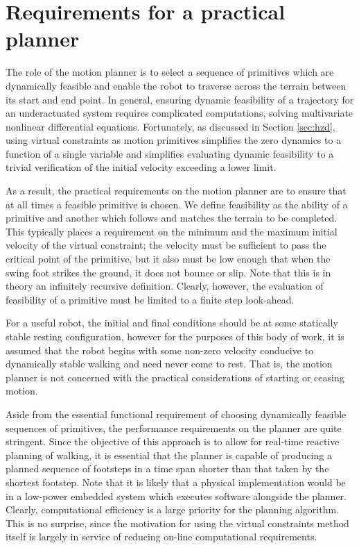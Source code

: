 \section{Requirements for a practical planner}
The role of the motion planner is to select a sequence of primitives which are dynamically feasible and enable the robot to traverse across the terrain between its start and end point. In general, ensuring dynamic feasibility of a trajectory for an underactuated system requires complicated computations, solving multivariate nonlinear differential equations. Fortunately, as discussed in Section \ref{sec:hzd}, using virtual constraints as motion primitives simplifies the zero dynamics to a function of a single variable and simplifies evaluating dynamic feasibility to a trivial verification of the initial velocity exceeding a lower limit.

As a result, the practical requirements on the motion planner are to ensure that at all times a feasible primitive is chosen. We define feasibility as the ability of a primitive and another which follows and matches the terrain to be completed. This typically places a requirement on the minimum and the maximum initial velocity of the virtual constraint; the velocity must be sufficient to pass the critical point of the primitive, but it also must be low enough that when the swing foot strikes the ground, it does not bounce or slip. Note that this is in theory an infinitely recursive definition. Clearly, however, the evaluation of feasibility of a primitive must be limited to a finite step look-ahead.

For a useful robot, the initial and final conditions should be at some statically stable resting configuration, however for the purposes of this body of work, it is assumed that the robot begins with some non-zero velocity conducive to dynamically stable walking and need never come to rest. That is, the motion planner is not concerned with the practical considerations of starting or ceasing motion.

Aside from the essential functional requirement of choosing dynamically feasible sequences of primitives, the performance requirements on the planner are quite stringent. Since the objective of this approach is to allow for real-time reactive planning of walking, it is essential that the planner is capable of producing a planned sequence of footsteps in a time span shorter than that taken by the shortest footstep. Note that it is likely that a physical implementation would be in a low-power embedded system which executes software alongside the planner. Clearly, computational efficiency is a large priority for the planning algorithm. This is no surprise, since the motivation for using the virtual constraints method itself is largely in service of reducing on-line computational requirements.

